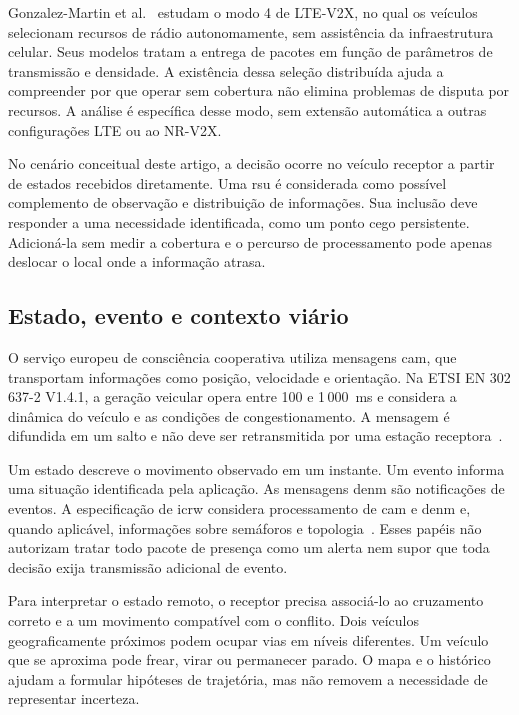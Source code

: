 \documentclass[conference,a4paper]{IEEEtran}
\begin{document}
Gonzalez-Martin et al.~\cite{gonzalez2019} estudam o modo 4 de LTE-V2X, no qual os veículos selecionam recursos de rádio autonomamente, sem assistência da infraestrutura celular. Seus modelos tratam a entrega de pacotes em função de parâmetros de transmissão e densidade. A existência dessa seleção distribuída ajuda a compreender por que operar sem cobertura não elimina problemas de disputa por recursos. A análise é específica desse modo, sem extensão automática a outras configurações LTE ou ao NR-V2X.

No cenário conceitual deste artigo, a decisão ocorre no veículo receptor a partir de estados recebidos diretamente. Uma \ac{rsu} é considerada como possível complemento de observação e distribuição de informações. Sua inclusão deve responder a uma necessidade identificada, como um ponto cego persistente. Adicioná-la sem medir a cobertura e o percurso de processamento pode apenas deslocar o local onde a informação atrasa.

\subsection{Estado, evento e contexto viário}
O serviço europeu de consciência cooperativa utiliza mensagens \ac{cam}, que transportam informações como posição, velocidade e orientação. Na ETSI EN 302 637-2 V1.4.1, a geração veicular opera entre 100 e 1\,000~ms e considera a dinâmica do veículo e as condições de congestionamento. A mensagem é difundida em um salto e não deve ser retransmitida por uma estação receptora~\cite{etsiCAM2019}.

Um estado descreve o movimento observado em um instante. Um evento informa uma situação identificada pela aplicação. As mensagens \ac{denm} são notificações de eventos. A especificação de \ac{icrw} considera processamento de \ac{cam} e \ac{denm} e, quando aplicável, informações sobre semáforos e topologia~\cite{etsiICRW2018}. Esses papéis não autorizam tratar todo pacote de presença como um alerta nem supor que toda decisão exija transmissão adicional de evento.

Para interpretar o estado remoto, o receptor precisa associá-lo ao cruzamento correto e a um movimento compatível com o conflito. Dois veículos geograficamente próximos podem ocupar vias em níveis diferentes. Um veículo que se aproxima pode frear, virar ou permanecer parado. O mapa e o histórico ajudam a formular hipóteses de trajetória, mas não removem a necessidade de representar incerteza.
\end{document}
